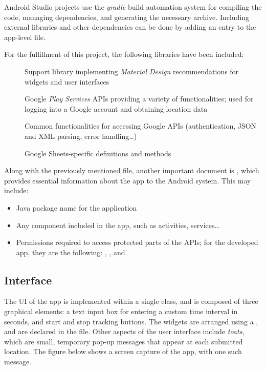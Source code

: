 Android Studio projects use the \emph{gradle} build automation system for compiling the code, managing dependencies, and generating the necessary  archive.
Including external libraries and other dependencies can be done by adding an entry to the app-level  file.

For the fulfillment of this project, the following libraries have been included:
\begin{description}
	\item[{\footnotesize{}}] Support library implementing \emph{Material Design} recommendations for widgets and user interfaces
	\item[{\footnotesize{}}] Google \emph{Play Services} APIs providing a variety of functionalities; used for logging into a Google account and obtaining location data
	\item[{\footnotesize{}}] Common functionalities for accessing Google APIs (authentication, JSON and XML parsing, error handling\dots)
	\item[{\footnotesize{}}] Google Sheets-specific definitions and methods
\end{description}

Along with the previously mentioned  file, another important document is , which provides essential information about the app to the Android system.
This may include:
\begin{itemize}
	\item Java package name for the application
	\item Any component included in the app, such as activities, services\dots
	\item Permissions required to access protected parts of the APIs; for the developed app, they are the following: , ,  and 
\end{itemize}


\subsection{Interface}
The UI of the app is implemented within a single  class, and is composed of three graphical elements: a text input box for entering a custom time interval in seconds, and start and stop tracking buttons.
The widgets are arranged using a , and are declared in the  file.
Other aspects of the user interface include \emph{toats}, which are small, temporary pop-up messages that appear at each submitted location.
The figure below shows a screen capture of the app, with one such message.

